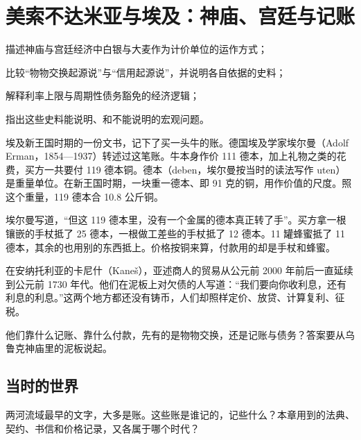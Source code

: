 \chapter{美索不达米亚与埃及：神庙、宫廷与记账}\label{ch:mesopotamia}

\begin{chapterguide}
\begin{guidegoals}
\item 描述神庙与宫廷经济中白银与大麦作为计价单位的运作方式；
\item 比较“物物交换起源说”与“信用起源说”，并说明各自依据的史料；
\item 解释利率上限与周期性债务豁免的经济逻辑；
\item 指出这些史料能说明、和不能说明的宏观问题。
\end{guidegoals}
\end{chapterguide}

埃及新王国时期的一份文书，记下了买一头牛的账。德国埃及学家埃尔曼（Adolf Erman，1854—1937）转述过这笔账。牛本身作价 111 德本，加上礼物之类的花费，买方一共要付 119 德本铜。德本（deben，埃尔曼按当时的读法写作 uten）是重量单位。在新王国时期，一块重一德本、即 91 克的铜，用作价值的尺度\cite{erman1894}。照这个重量，119 德本合 10.8 公斤铜。

埃尔曼写道，“但这 119 德本里，没有一个金属的德本真正转了手”。买方拿一根镶嵌的手杖抵了 25 德本，一根做工差些的手杖抵了 12 德本。11 罐蜂蜜抵了 11 德本，其余的也用别的东西抵上\cite{erman1894}。价格按铜来算，付款用的却是手杖和蜂蜜。

在安纳托利亚的卡尼什（Kaneš），亚述商人的贸易从公元前 2000 年前后一直延续到公元前 1730 年代\cite{woods2010}。他们在泥板上对欠债的人写道：“我们要向你收利息，还有利息的利息。”\cite{cad_s}这两个地方都还没有铸币，人们却照样定价、放贷、计算复利、征税。

他们靠什么记账、靠什么付款，先有的是物物交换，还是记账与债务？答案要从乌鲁克神庙里的泥板说起。

\section{当时的世界}\label{sec:meso-world}

两河流域最早的文字，大多是账。这些账是谁记的，记些什么？本章用到的法典、契约、书信和价格记录，又各属于哪个时代？

